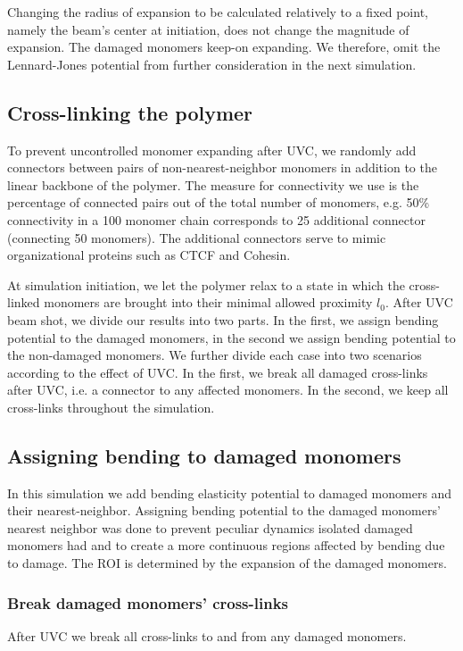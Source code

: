 \documentclass[12pt]{report}
\begin{document}
      Changing the radius of expansion to be calculated relatively to a fixed point, namely the beam's center at initiation, does not change the magnitude of expansion. The damaged monomers keep-on expanding.       
      We therefore, omit the Lennard-Jones potential from further consideration in the next simulation.


   \subsection{Cross-linking the polymer}
    To prevent uncontrolled monomer expanding after UVC, we randomly add connectors between pairs of non-nearest-neighbor monomers in addition to the linear backbone of the polymer. The measure for connectivity we use is the percentage of connected pairs out of the total number of monomers, e.g. 50\% connectivity in a 100 monomer chain corresponds to 25 additional connector (connecting 50 monomers). The additional connectors serve to mimic organizational proteins such as CTCF and Cohesin. 
	
	At simulation initiation, we let the polymer relax to a state in which the cross-linked monomers are brought into their minimal allowed proximity $l_0$. After UVC beam shot, we divide our results into two parts. In the first, we assign bending potential to the damaged monomers, in the second we assign bending potential to the non-damaged monomers. We further divide each case into two scenarios according to the effect of UVC. In the first, we break all damaged cross-links after UVC, i.e. a connector to any affected monomers. In the second, we keep all cross-links throughout the simulation. 
	
	\subsection{Assigning bending to damaged monomers}
	In this simulation we add bending elasticity potential to damaged monomers and their nearest-neighbor. Assigning bending potential to the damaged monomers' nearest neighbor was done to prevent peculiar dynamics isolated damaged monomers had and to create a more continuous regions affected by bending due to damage. The ROI is determined by the expansion of the damaged monomers. 
	
	\subsubsection{Break damaged monomers' cross-links}
	After UVC we break all cross-links to and from any damaged monomers. 
		
\end{document}
